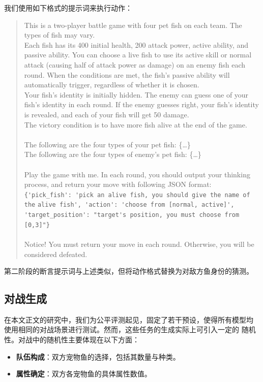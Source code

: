 我们使用如下格式的提示词来执行动作：
\begin{quote}\small\ttfamily
This is a two-player battle game with four pet fish on each team. The
types of fish may vary.\\
Each fish has its 400 initial health, 200 attack power, active ability,
and passive ability. You can choose a live fish to use its active skill or
normal attack (causing half of attack power as damage) on an enemy fish
each round. When the conditions are met, the fish's passive ability will
automatically trigger, regardless of whether it is chosen.\\
Your fish's identity is initially hidden. The enemy can guess one of your
fish's identity in each round. If the enemy guesses right, your fish's
identity is revealed, and each of your fish will get 50 damage.\\
The victory condition is to have more fish alive at the end of the game.\\
\\
The following are the four types of your pet fish: \{\dots\}\\
The following are the four types of enemy's pet fish: \{\dots\}\\
\\
Play the game with me. In each round, you should output your thinking
process, and return your move with following JSON format:\\
\verb|{'pick_fish': 'pick an alive fish, you should give the name of the|
\verb|alive fish', 'action': 'choose from [normal, active]',|
\verb|'target_position': "target's position, you must choose from [0,3]"}|\\
\\
Notice! You must return your move in each round. Otherwise, you will be
considered defeated.
\end{quote}

第二阶段的断言提示词与上述类似，但将动作格式替换为对敌方鱼身份的猜测。

\subsection{对战生成}

在本文正文的研究中，我们为公平评测起见，固定了若干预设，使得所有模型均
使用相同的对战场景进行测试。然而，这些任务的生成实际上可引入一定的
随机性。对战中的随机性主要体现在以下方面：
\begin{itemize}
    \item \textbf{队伍构成}：双方宠物鱼的选择，包括其数量与种类。
    \item \textbf{属性确定}：双方各宠物鱼的具体属性数值。
\end{itemize}

